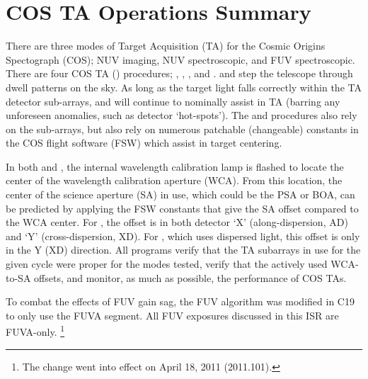 \section{COS TA Operations Summary}\label{sec:TAoperations}

There are three modes of Target Acquisition (TA) for the Cosmic Origins Spectograph (COS); NUV imaging, NUV spectroscopic, and FUV spectroscopic.
There are four COS TA (\tacq{}) procedures; , , , and .
 and  step the telescope through dwell patterns on the sky.
As long as the target light falls correctly within the TA detector sub-arrays,  and  will continue to nominally assist in TA (barring any unforeseen anomalies, such as detector `hot-spots').
The  and  procedures also rely on the sub-arrays, but also rely on numerous patchable (changeable) constants
in the COS flight software (FSW) which assist in target centering.

In both  and , the internal wavelength calibration lamp is flashed to locate the center of the wavelength calibration aperture (WCA).
From this location, the center of the science aperture (SA) in use, which could be the PSA or BOA, can be predicted by applying the FSW constants that give the SA offset compared to the WCA center. For ,
the offset is in both detector `X' (along-dispersion, AD) and `Y' (cross-dispersion, XD).
For , which uses dispersed light, this offset is only in the Y (XD) direction.
All programs verify that the TA subarrays in use for the given cycle were proper for the \tacq modes tested, verify that the actively used WCA-to-SA offsets, and monitor, as much as possible, the performance of COS TAs.

To combat the effects of FUV gain sag, the FUV  algorithm was modified in C19 to only use the FUVA segment. All FUV  exposures discussed in this ISR are FUVA-only.
\footnote{The change went into effect on April 18, 2011 (2011.101).}

